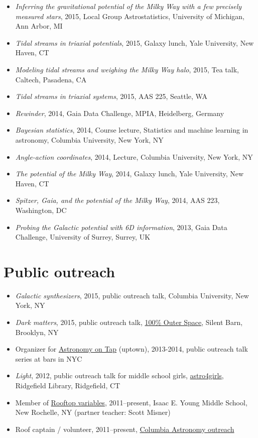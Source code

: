 \documentclass[12pt,letterpaper]{article}
\begin{document}
\begin{itemize}

        \item \emph{Inferring the gravitational potential of the Milky Way with a few precisely measured stars}, 2015, Local Group Astrostatistics, University of Michigan, Ann Arbor, MI
        \item \emph{Tidal streams in triaxial potentials}, 2015, Galaxy lunch, Yale University, New Haven, CT
	\item \emph{Modeling tidal streams and weighing the Milky Way halo}, 2015, Tea talk, Caltech, Pasadena, CA
	\item \emph{Tidal streams in triaxial systems}, 2015, AAS 225, Seattle, WA
	\item \emph{Rewinder}, 2014, Gaia Data Challenge, MPIA, Heidelberg, Germany
	\item \emph{Bayesian statistics}, 2014, Course lecture, Statistics and machine learning in astronomy, Columbia University, New York, NY
	\item \emph{Angle-action coordinates}, 2014, Lecture, Columbia University, New York, NY
	\item \emph{The potential of the Milky Way}, 2014, Galaxy lunch, Yale University, New Haven, CT
	\item \emph{Spitzer, Gaia, and the potential of the Milky Way}, 2014, AAS 223, Washington, DC
	\item \emph{Probing the Galactic potential with 6D information}, 2013, Gaia Data Challenge, University of Surrey, Surrey, UK

\end{itemize}

\section*{Public outreach}

\begin{itemize}
	\item \emph{Galactic synthesizers}, 2015, public outreach talk, Columbia University, New York, NY
	\item \emph{Dark matters}, 2015, public outreach talk, \href{http://silentbarn.org/2015/03/100-outer-space-party}{100\% Outer Space}, Silent Barn, Brooklyn, NY
	\item Organizer for \href{http://astronomyontap.org/}{Astronomy on Tap} (uptown), 2013-2014, public outreach talk series at bars in NYC
	\item \emph{Light}, 2012, public outreach talk for middle school girls, \href{http://www.newstimes.com/news/article/Astronomer-Shoot-for-the-stars-3380793.php}{astro4girls}, Ridgefield Library, Ridgefield, CT
	\item Member of \href{http://rv.astro.columbia.edu}{Rooftop variables}, 2011--present, Isaac E. Young Middle School, New Rochelle, NY (partner teacher: Scott Misner)
	\item Roof captain / volunteer, 2011--present, \href{http://outreach.astro.columbia.edu/}{Columbia Astronomy outreach}

\end{itemize}
\end{document}
